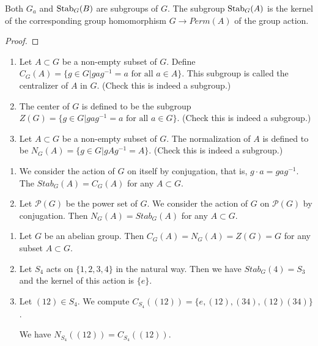 \begin{lem}Both $G_a$ and $ {\rm Stab}_G(B)$ are subgroups of $G$. The subgroup ${\rm Stab}_G(A)$ is the kernel of the corresponding group homomorphism $G \rightarrow Perm(A)$ of the group action.
\end{lem}

\begin{proof}

\end{proof}

\begin{defi}
    \begin{enumerate}
        \item Let $A \subset G$ be a non-empty subset of $G$. Define  $C_G(A) = \{g \in G \vert g a g^{-1} = a \text{ for all } a \in A\}$. This subgroup is called the centralizer of $A$ in $G$. (Check this is indeed a subgroup.)
        \item The center of $G$ is defined to be the subgroup $Z(G) = \{g\in G \vert g a g^{-1} =a \text{ for all } a \in G\}$. (Check this is indeed a subgroup.)
        \item Let $A \subset G$ be a non-empty subset of $G$. The normalization of $A$ is defined to be $N_G(A) = \{g \in G \vert gAg^{-1} = A\}$. (Check this is indeed a subgroup.)
    \end{enumerate}
\end{defi}

\begin{lem}
    \begin{enumerate}
        \item We consider the action of $G$ on itself by conjugation, that is, $g \cdot a = gag^{-1}$. The $Stab_G(A) = C_G(A)$ for any $A \subset G$.
        \item Let $\mathcal{P}(G)$ be the power set of $G$. We consider the action of $G$ on $\mathcal{P}(G)$ by conjugation. Then $N_G(A) = Stab_G(A)$ for any $A \subset G$.
    \end{enumerate}
\end{lem}

\begin{example}
    \begin{enumerate}
        \item Let $G$ be an abelian group. Then $C_G(A) = N_G(A) = Z(G) = G$ for any subset $A \subset G$.
        \item Let $S_4$ acts on $\{1,2,3,4\}$ in the natural way. Then we have $Stab_G(4) = S_3$ and the kernel of this action is $\{e\}$.
        \item Let $(12) \in S_4$. We compute $C_{S_4}((12)) = \{e, (12), (34), (12)(34)\}$.

              We have $N_{S_4}((12)) = C_{S_4}((12))$.


    \end{enumerate}
\end{example}

